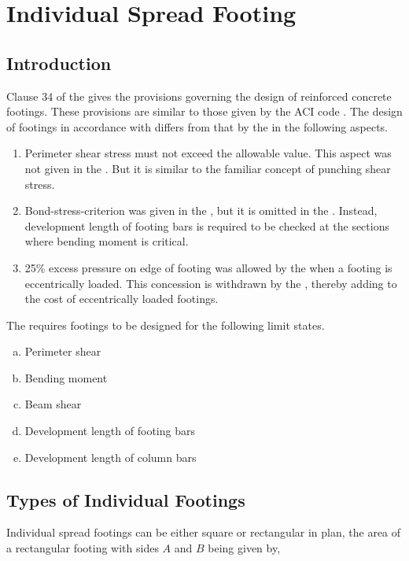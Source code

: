 \chapter{Individual Spread Footing}
\section{Introduction} Clause 34 of the   gives the
provisions governing the design of reinforced concrete footings.  These
provisions are similar to those given by the ACI code \cite{aci31877}. 
The design of footings in accordance with  differs
from that by the  in the following aspects.

\begin{enumerate}[I]
\item Perimeter shear stress must not exceed the allowable value. This
aspect was not given in the . But it is similar to
the familiar concept of punching shear stress.

\item Bond-stress-criterion was given in the , but it
is omitted in the . Instead, development length of
footing bars is required to be checked at the sections where bending
moment is critical.

\item 25\% excess pressure on edge of footing was allowed by the 
 when a footing is eccentrically loaded. This 
concession is withdrawn by the , thereby adding to 
the cost of eccentrically loaded footings.
\end{enumerate}
The  requires footings to be designed for 
the following limit states.

\begin{enumerate}[(a)]
\item Perimeter shear
\item Bending moment
\item Beam shear
\item Development length of footing bars
\item Development length of column bars
\end{enumerate}

\section{Types of Individual Footings} Individual spread footings can 
be either square or rectangular in plan, the area of a rectangular
footing with sides $A$ and $B$ being given by,

